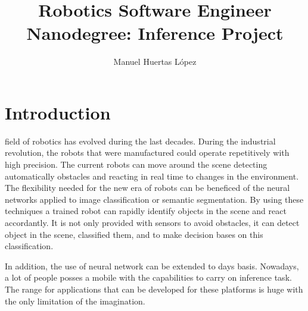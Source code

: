 \documentclass[10pt,journal,compsoc]{IEEEtran}
\begin{document}
	
\title{Robotics Software Engineer Nanodegree: Inference Project}
\author{Manuel Huertas L\'opez}

	
	
\maketitle
\IEEEdisplaynontitleabstractindextext
\IEEEpeerreviewmaketitle
\section{Introduction}
\label{sec:introduction}
 field of robotics has evolved during the last decades. During the industrial revolution, the robots that were manufactured could operate repetitively with high precision. The current robots can move around the scene detecting automatically obstacles and reacting in real time to changes in the environment. The flexibility needed for the new era of robots can be beneficed of the neural networks applied to image classification or semantic segmentation. By using these techniques a trained robot can rapidly identify objects in the scene and react accordantly.  It is not only provided with sensors to avoid obstacles, it can detect object in the scene, classified them, and to make decision bases on this classification.

In addition, the use of neural network can be extended to days basis. Nowadays, a lot of people posses a mobile with the capabilities to carry on inference task. The range for applications that can be developed for these platforms is huge with the only limitation of the imagination.
\end{document}

